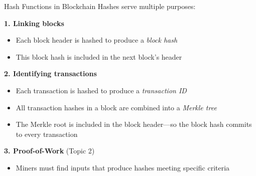 \documentclass[10pt]{beamer}
\begin{document}
\begin{frame}{Hash Functions in Blockchain}
  Hashes serve multiple purposes:

  \vspace{0.5em}
  \textbf{1. Linking blocks}
  \begin{itemize}
    \item Each block header is hashed to produce a \textit{block hash}
    \item This block hash is included in the next block's header
  \end{itemize}

  \vspace{0.5em}
  \textbf{2. Identifying transactions}
  \begin{itemize}
    \item Each transaction is hashed to produce a \textit{transaction ID}
    \item All transaction hashes in a block are combined into a \textit{Merkle tree}
    \item The Merkle root is included in the block header---so the block hash commits to every transaction
  \end{itemize}

  \vspace{0.5em}
  \textbf{3. Proof-of-Work} (Topic 2)
  \begin{itemize}
    \item Miners must find inputs that produce hashes meeting specific criteria
  \end{itemize}
\end{frame}
\end{document}
